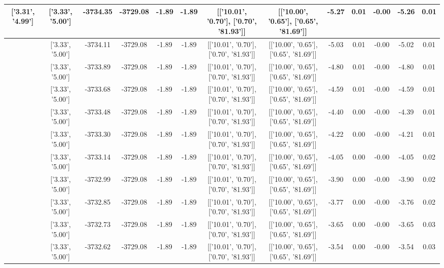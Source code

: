 \begin{table}[htbp]
\begin{adjustbox}{angle=90}
\begin{tabular}{|c|c|c|c|c|c|c|c|c|c|c|c|c|}
 ['3.31', '4.99'] & ['3.33', '5.00'] & -3734.35 & -3729.08 & -1.89 & -1.89 & [['10.01', '0.70'], ['0.70', '81.93']] & [['10.00', '0.65'], ['0.65', '81.69']] & -5.27 & 0.01 & -0.00 & -5.26 & 0.01\\ \hline
 ['3.31', '4.99'] & ['3.33', '5.00'] & -3734.11 & -3729.08 & -1.89 & -1.89 & [['10.01', '0.70'], ['0.70', '81.93']] & [['10.00', '0.65'], ['0.65', '81.69']] & -5.03 & 0.01 & -0.00 & -5.02 & 0.01\\ \hline
 ['3.31', '4.99'] & ['3.33', '5.00'] & -3733.89 & -3729.08 & -1.89 & -1.89 & [['10.01', '0.70'], ['0.70', '81.93']] & [['10.00', '0.65'], ['0.65', '81.69']] & -4.80 & 0.01 & -0.00 & -4.80 & 0.01\\ \hline
 ['3.31', '4.99'] & ['3.33', '5.00'] & -3733.68 & -3729.08 & -1.89 & -1.89 & [['10.01', '0.70'], ['0.70', '81.93']] & [['10.00', '0.65'], ['0.65', '81.69']] & -4.59 & 0.01 & -0.00 & -4.59 & 0.01\\ \hline
 ['3.32', '4.99'] & ['3.33', '5.00'] & -3733.48 & -3729.08 & -1.89 & -1.89 & [['10.01', '0.70'], ['0.70', '81.93']] & [['10.00', '0.65'], ['0.65', '81.69']] & -4.40 & 0.00 & -0.00 & -4.39 & 0.01\\ \hline
 ['3.32', '5.00'] & ['3.33', '5.00'] & -3733.30 & -3729.08 & -1.89 & -1.89 & [['10.01', '0.70'], ['0.70', '81.93']] & [['10.00', '0.65'], ['0.65', '81.69']] & -4.22 & 0.00 & -0.00 & -4.21 & 0.01\\ \hline
 ['3.32', '5.00'] & ['3.33', '5.00'] & -3733.14 & -3729.08 & -1.89 & -1.89 & [['10.01', '0.70'], ['0.70', '81.93']] & [['10.00', '0.65'], ['0.65', '81.69']] & -4.05 & 0.00 & -0.00 & -4.05 & 0.02\\ \hline
 ['3.32', '5.00'] & ['3.33', '5.00'] & -3732.99 & -3729.08 & -1.89 & -1.89 & [['10.01', '0.70'], ['0.70', '81.93']] & [['10.00', '0.65'], ['0.65', '81.69']] & -3.90 & 0.00 & -0.00 & -3.90 & 0.02\\ \hline
 ['3.32', '5.00'] & ['3.33', '5.00'] & -3732.85 & -3729.08 & -1.89 & -1.89 & [['10.01', '0.70'], ['0.70', '81.93']] & [['10.00', '0.65'], ['0.65', '81.69']] & -3.77 & 0.00 & -0.00 & -3.76 & 0.02\\ \hline
 ['3.32', '5.00'] & ['3.33', '5.00'] & -3732.73 & -3729.08 & -1.89 & -1.89 & [['10.01', '0.70'], ['0.70', '81.93']] & [['10.00', '0.65'], ['0.65', '81.69']] & -3.65 & 0.00 & -0.00 & -3.65 & 0.03\\ \hline
 ['3.32', '5.00'] & ['3.33', '5.00'] & -3732.62 & -3729.08 & -1.89 & -1.89 & [['10.01', '0.70'], ['0.70', '81.93']] & [['10.00', '0.65'], ['0.65', '81.69']] & -3.54 & 0.00 & -0.00 & -3.54 & 0.03\\ \hline

\end{tabular}
\end{adjustbox}
\end{table}
